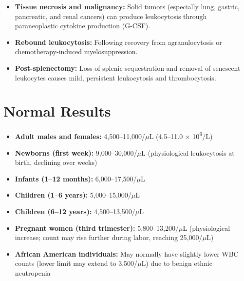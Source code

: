 \begin{itemize}
  \item \textbf{Tissue necrosis and malignancy:} Solid tumors (especially lung, gastric, pancreatic, and renal cancers) can produce leukocytosis through paraneoplastic cytokine production (G-CSF).
  \item \textbf{Rebound leukocytosis:} Following recovery from agranulocytosis or chemotherapy-induced myelosuppression.
  \item \textbf{Post-splenectomy:} Loss of splenic sequestration and removal of senescent leukocytes causes mild, persistent leukocytosis and thrombocytosis.
\end{itemize}

\section*{Normal Results}
\begin{itemize}
  \item \textbf{Adult males and females:} 4,500--11,000/$\mu$L (4.5--11.0 $\times$ 10\textsuperscript{9}/L)
  \item \textbf{Newborns (first week):} 9,000--30,000/$\mu$L (physiological leukocytosis at birth, declining over weeks)
  \item \textbf{Infants (1--12 months):} 6,000--17,500/$\mu$L
  \item \textbf{Children (1--6 years):} 5,000--15,000/$\mu$L
  \item \textbf{Children (6--12 years):} 4,500--13,500/$\mu$L
  \item \textbf{Pregnant women (third trimester):} 5,800--13,200/$\mu$L (physiological increase; count may rise further during labor, reaching 25,000/$\mu$L)
  \item \textbf{African American individuals:} May normally have slightly lower WBC counts (lower limit may extend to 3,500/$\mu$L) due to benign ethnic neutropenia
\end{itemize}

